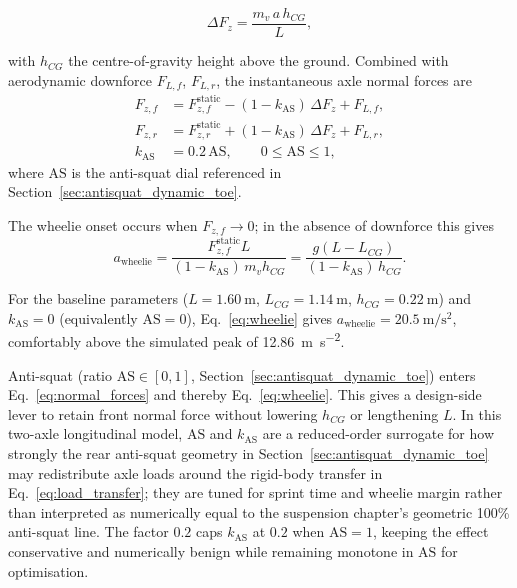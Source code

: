 \begin{equation}
\Delta F_z = \frac{m_v \, a \, h_{CG}}{L},
\label{eq:load_transfer}
\end{equation}

with $h_{CG}$ the centre-of-gravity height above the ground. Combined
with aerodynamic downforce $F_{L,f}$, $F_{L,r}$, the instantaneous
axle normal forces are
\begin{equation}
\begin{aligned}
F_{z,f} &= F_{z,f}^\text{static} - (1 - k_\text{AS})\,\Delta F_z + F_{L,f},\\
F_{z,r} &= F_{z,r}^\text{static} + (1 - k_\text{AS})\,\Delta F_z + F_{L,r},\\
k_\text{AS} &= 0.2\,\text{AS}, \qquad 0 \le \text{AS} \le 1,
\end{aligned}
\label{eq:normal_forces}
\end{equation}
where $\text{AS}$ is the anti-squat dial referenced in Section~\ref{sec:antisquat_dynamic_toe}.

The wheelie onset occurs when $F_{z,f} \to 0$; in the absence of
downforce this gives
\begin{equation}
a_\text{wheelie} = \frac{F_{z,f}^\text{static} L}{(1 - k_\text{AS})\, m_v h_{CG}}
                 = \frac{g (L - L_{CG})}{(1 - k_\text{AS})\, h_{CG}}.
\label{eq:wheelie}
\end{equation}

For the baseline parameters ($L = \SI{1.60}{\metre}$,
$L_{CG} = \SI{1.14}{\metre}$, $h_{CG} = \SI{0.22}{\metre}$) and
$k_\text{AS}=0$ (equivalently $\text{AS}=0$), Eq.~\ref{eq:wheelie}
gives $a_\text{wheelie} = \SI{20.5}{\metre\per\second\squared}$,
comfortably above the simulated peak of
\SI{12.86}{\metre\per\second\squared}.

Anti-squat (ratio $\text{AS} \in [0, 1]$, Section~\ref{sec:antisquat_dynamic_toe})
enters Eq.~\ref{eq:normal_forces} and thereby Eq.~\ref{eq:wheelie}.
This gives a design-side lever to
retain front normal force without lowering $h_{CG}$ or lengthening
$L$.
In this two-axle longitudinal model, $\text{AS}$ and $k_\text{AS}$ are a reduced-order surrogate for how strongly the rear anti-squat geometry in Section~\ref{sec:antisquat_dynamic_toe} may redistribute axle loads around the rigid-body transfer in Eq.~\ref{eq:load_transfer}; they are tuned for sprint time and wheelie margin rather than interpreted as numerically equal to the suspension chapter's geometric 100\% anti-squat line.
The factor $0.2$ caps $k_\text{AS}$ at $0.2$ when $\text{AS}=1$, keeping the effect conservative and numerically benign while remaining monotone in $\text{AS}$ for optimisation.

